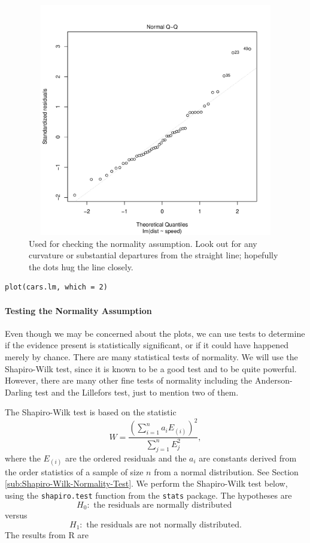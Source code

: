 \documentclass[captions=tableheading]{scrbook}
\begin{document}
\begin{figure}[ht!]
  \includegraphics[width=5in, height=4in]{img/Normal-q-q-plot-cars.pdf}
  \caption[Normal q-q plot of the residuals for the \texttt{cars} data]{\small Used for checking the normality assumption. Look out for
any curvature or substantial departures from the straight line; hopefully
the dots hug the line closely.}
  \label{fig:Normal-q-q-plot-cars}
\end{figure}


\begin{verbatim}
plot(cars.lm, which = 2)
\end{verbatim}


\paragraph*{Testing the Normality Assumption}

Even though we may be concerned about the plots, we can use tests to determine if the evidence present is statistically significant, or if it could have happened merely by chance. There are many statistical tests of normality. We will use the Shapiro-Wilk test, since it is known to be a good test and to be quite powerful. However, there are many other fine tests of normality including the Anderson-Darling test and the Lillefors test, just to mention two of them.  


The Shapiro-Wilk test is based on the statistic
\begin{equation}
W=\frac{\left(\sum_{i=1}^{n}a_{i}E_{(i)}\right)^{2}}{\sum_{j=1}^{n}E_{j}^{2}},
\end{equation}
where the \(E_{(i)}\) are the ordered residuals and the \(a_{i}\) are constants derived from the order statistics of a sample of size \(n\) from a normal distribution. See Section \ref{sub:Shapiro-Wilk-Normality-Test}.
We perform the Shapiro-Wilk test below, using the \texttt{shapiro.test} function from the \texttt{stats} package. The hypotheses are
\[
H_{0}:\mbox{ the residuals are normally distributed }
\]
versus
\[
H_{1}:\mbox{ the residuals are not normally distributed.}
\]
The results from \textsf{R} are
\end{document}

